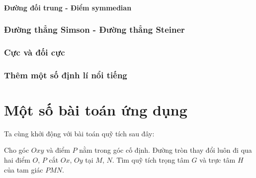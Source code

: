\documentclass{article} %
\begin{document}
    \subsection{Đường đối trung - Điểm symmedian}

    \section{Đường thẳng Simson - Đường thẳng Steiner}

    \section{Cực và đối cực}

    \section{Thêm một số định lí nổi tiếng}

    \newpage

    \part{Một số bài toán ứng dụng}

    Ta cùng khởi động với bài toán quỹ tích sau đây:

        \begin{problem}
            Cho góc \(Oxy\) và điểm \(P\) nằm trong góc cố định. Đường tròn thay đổi luôn đi qua hai điểm \(O\), \(P\) cắt \(Ox\), \(Oy\) tại \(M\), \(N\). Tìm quỹ tích trọng tâm \(G\) và trực tâm \(H\) của tam giác \(PMN\).
        \end{problem}
\end{document}
